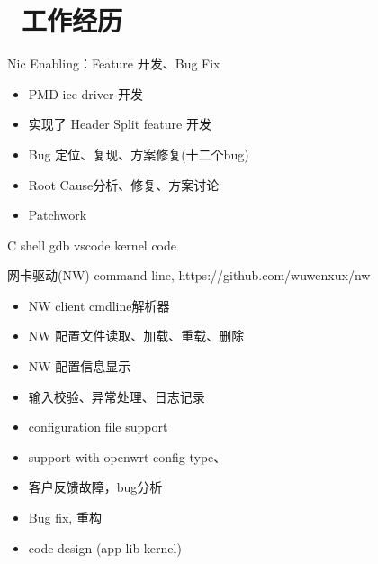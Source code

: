 \documentclass{resume}
\begin{document}


 
\section{\faUsers\ 工作经历}
\begin{onehalfspacing}
Nic Enabling：Feature 开发、Bug Fix
\begin{itemize}
  \item PMD ice driver 开发
  \item 实现了 Header Split feature 开发
  \item Bug 定位、复现、方案修复(十二个bug)
  \item Root Cause分析、修复、方案讨论
  \item Patchwork
\end{itemize} 
\end{onehalfspacing}

 {C  shell gdb vscode kernel code}
\begin{onehalfspacing}
网卡驱动(NW) command line, https://github.com/wuwenxux/nw
\begin{itemize}
  \item NW client cmdline解析器
  \item NW 配置文件读取、加载、重载、删除
  \item NW 配置信息显示
  \item 输入校验、异常处理、日志记录
  \item configuration file support
  \item support with openwrt config type、
  \item 客户反馈故障，bug分析
  \item Bug fix, 重构
  \item code design (app lib kernel) 
\end{itemize}
\end{onehalfspacing}
\end{document}

